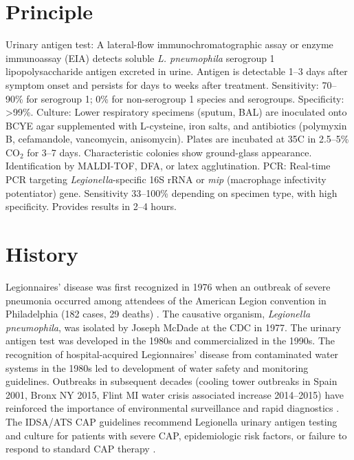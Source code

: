 \section*{Principle}
Urinary antigen test: A lateral-flow immunochromatographic assay or enzyme immunoassay (EIA) detects soluble \textit{L. pneumophila} serogroup 1 lipopolysaccharide antigen excreted in urine. Antigen is detectable 1--3 days after symptom onset and persists for days to weeks after treatment. Sensitivity: 70--90\% for serogroup 1; 0\% for non-serogroup 1 species and serogroups. Specificity: >99\%. Culture: Lower respiratory specimens (sputum, BAL) are inoculated onto BCYE agar supplemented with L-cysteine, iron salts, and antibiotics (polymyxin B, cefamandole, vancomycin, anisomycin). Plates are incubated at 35\textdegree{}C in 2.5--5\% CO$_2$ for 3--7 days. Characteristic colonies show ground-glass appearance. Identification by MALDI-TOF, DFA, or latex agglutination. PCR: Real-time PCR targeting \textit{Legionella}-specific 16S rRNA or \textit{mip} (macrophage infectivity potentiator) gene. Sensitivity 33--100\% depending on specimen type, with high specificity. Provides results in 2--4 hours.

\section*{History}
Legionnaires' disease was first recognized in 1976 when an outbreak of severe pneumonia occurred among attendees of the American Legion convention in Philadelphia (182 cases, 29 deaths) \cite{fields2002legionella}. The causative organism, \textit{Legionella pneumophila}, was isolated by Joseph McDade at the CDC in 1977. The urinary antigen test was developed in the 1980s and commercialized in the 1990s. The recognition of hospital-acquired Legionnaires' disease from contaminated water systems in the 1980s led to development of water safety and monitoring guidelines. Outbreaks in subsequent decades (cooling tower outbreaks in Spain 2001, Bronx NY 2015, Flint MI water crisis associated increase 2014--2015) have reinforced the importance of environmental surveillance and rapid diagnostics \cite{phin2014epidemiology}. The IDSA/ATS CAP guidelines recommend Legionella urinary antigen testing and culture for patients with severe CAP, epidemiologic risk factors, or failure to respond to standard CAP therapy \cite{metlay2019diagnosis}.

